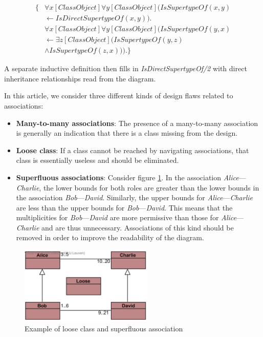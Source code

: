 \documentclass[conference]{IEEEtran}
\begin{document}
\begin{align*}
	\{ &\forall{x}[ClassObject]\forall{y}[ClassObject](IsSupertypeOf(x, y) \\ &\leftarrow IsDirectSupertypeOf(x, y)). \\
	&\forall{x}[ClassObject]\forall{y}[ClassObject](IsSupertypeOf(y, x) \\ &\leftarrow \exists{z}[ClassObject](IsSupertypeOf(y, z)  \\ &\land IsSupertypeOf(z, x))).\}
\end{align*}

A separate inductive definition then fills in \textit{IsDirectSupertypeOf/2} with direct inheritance relationships read from the diagram.

In this article, we consider three different kinds of design flaws related to associations:

\begin{itemize}
	\item \textbf{Many-to-many associations}: The presence of a many-to-many association is generally an indication that there is a class missing from the design.
	\item \textbf{Loose class}: If a class cannot be reached by navigating associations, that class is essentially useless and should be eliminated.
	\item \textbf{Superfluous associations}\cite{Balaban2015}: Consider figure \ref{fig:design-flaw}. In the association \textit{Alice}---\textit{Charlie}, the lower bounds for both roles are greater than the lower bounds in the association \textit{Bob}---\textit{David}. Similarly, the upper bounds for \textit{Alice}---\textit{Charlie} are less than the upper bounds for \textit{Bob}---\textit{David}. This means that the multiplicities for \textit{Bob}---\textit{David} are more permissive than those for \textit{Alice}---\textit{Charlie} and are thus unnecessary. Associations of this kind should be removed in order to improve the readability of the diagram.
\end{itemize}

\begin{figure}[!t]
	\centering
	\includegraphics[width=2.5in]{hierarchy}
	\caption{Example of loose class and superfluous association}
	\label{fig:design-flaw}
\end{figure}
\end{document}
